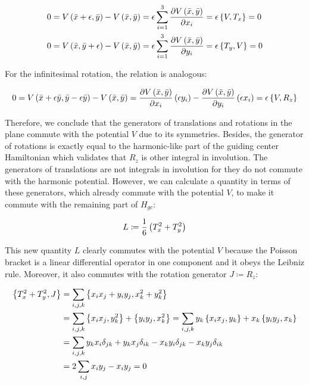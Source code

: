 \begin{align*}
0={V\left( \bar{x}+\epsilon,\bar{y} \right) - V\left( \bar{x},\bar{y} \right)} &= \epsilon \sum_{i = 1}^3 \frac{\partial V\left( \bar{x},\bar{y} \right)}{\partial x_i}  = \epsilon \left\lbrace V, T_x \right\rbrace = 0\\
0={V\left( \bar{x},\bar{y}+\epsilon \right) - V\left( \bar{x},\bar{y} \right)} &= \epsilon \sum_{i = 1}^3 \frac{\partial V\left( \bar{x},\bar{y} \right)}{\partial y_i} = \epsilon \left\lbrace T_y, V \right\rbrace = 0
\end{align*}

For the infinitesimal rotation, the relation is analogous:

\begin{equation*}
0={V\left( \bar{x} +\epsilon \bar{y}, \bar{y} - \epsilon \bar{y} \right)-V\left( \bar{x},\bar{y} \right)}
= \frac{\partial V\left( \bar{x},\bar{y} \right)}{\partial x_i} \left( \epsilon y_i \right) -                                \frac{\partial V\left( \bar{x},\bar{y} \right)}{\partial y_i} \left( \epsilon x_i \right)                                        = \epsilon \left\lbrace V, R_z \right\rbrace
\end{equation*}

Therefore, we conclude that the generators of translations and rotations in the plane commute with the potential $V$ due to its symmetries. Besides, the generator of rotations is exactly equal to the harmonic-like part of the guiding center Hamiltonian which validates that $R_z$ is other integral in involution. The generators of translations are not integrals in involution for they do not commute with the harmonic potential. However, we can calculate a quantity in terms of these generators, which already commute with the potential $V$, to make it commute with the remaining part of $H_{gc}$: 

\begin{equation}
L \coloneqq \frac{1}{6}\left( T_x^2 + T_y^2 \right)
\label{eq:gccircle}
\end{equation}

This new quantity $L$ clearly commutes with the potential $V$ because the Poisson bracket is  a linear differential operator in one component and it obeys the Leibniz rule. Moreover, it also commutes with the rotation generator $J \coloneqq R_z$:

\begin{align*}
\left\lbrace T_x^2+ T_y^2,  J \right\rbrace &= \sum_{i,j,k} \left\lbrace x_ix_j + y_iy_j, x_k^2 + y_k^2 \right\rbrace\\
&= \sum_{i,j,k}  \left\lbrace x_ix_j, y_k^2 \right\rbrace + \left\lbrace y_iy_j, x_k^2 \right\rbrace = \sum_{i,j,k} y_k \left\lbrace x_ix_j, y_k \right\rbrace + x_k \left\lbrace y_iy_j, x_k \right\rbrace\\
&= \sum_{i,j,k} y_kx_i\delta_{jk}+y_kx_j\delta_{ik} - x_ky_i\delta_{jk}- x_ky_j\delta_{ik}\\
&= 2\sum_{i,j}x_iy_j-x_iy_j = 0
\end{align*}

